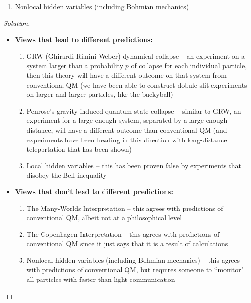 \begin{solution}[label=ques:2]
\begin{question}
\begin{enumerate}[label=(\Alph*)]
    \item Nonlocal hidden variables (including Bohmian mechanics)
  \end{enumerate}
  \end{question}
  \tcblower{}
  \begin{proof}[Solution]
    $ $
    \begin{itemize}
      \item \textbf{Views that lead to different predictions:}
        \begin{enumerate}
          \item GRW (Ghirardi-Rimini-Weber) dynamical collapse -- an experiment on a system larger than a probability $p$ of collapse for each individual particle, then this theory will have a different outcome on that system from conventional QM (we have been able to construct dobule slit experiments on larger and larger particles, like the buckyball)
          \item Penrose's gravity-induced quantum state collapse -- similar to GRW, an experiment for a large enough system, separated by a large enough distance, will have a different outcome than conventional QM (and experiments have been heading in this direction with long-distance teleportation that has been shown)
          \item Local hidden variables -- this has been proven false by experiments that disobey the Bell inequality
        \end{enumerate}
      \item \textbf{Views that don't lead to different predictions:}
        \begin{enumerate}
          \item The Many-Worlds Interpretation -- this agrees with predictions of conventional QM, albeit not at a philosophical level
          \item The Copenhagen Interpretation -- this agrees with predictions of conventional QM since it just says that it is a result of calculations
          \item Nonlocal hidden variables (including Bohmian mechanics) -- this agrees with predictions of conventional QM, but requires someone to ``monitor" all particles with faster-than-light communication
        \end{enumerate}
    \end{itemize}
  \end{proof}
\end{solution}
